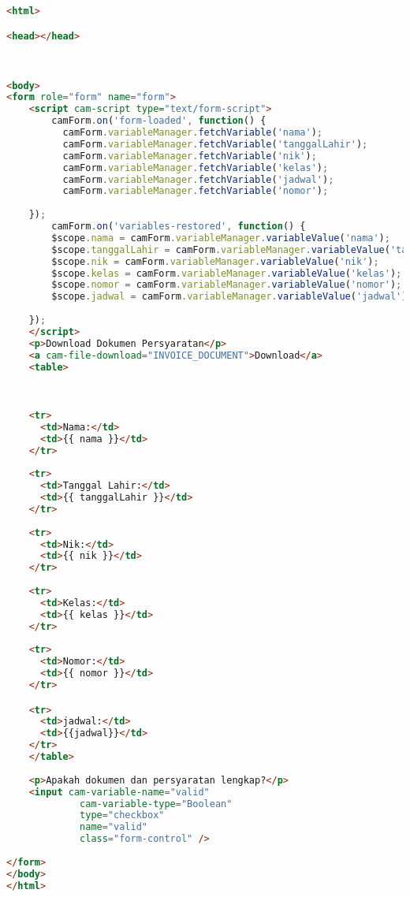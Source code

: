 \begin{lstlisting}[language=html,basicstyle=\tiny,caption=verifikasi-pendaftaran.html]
<html>

<head></head>


	
<body>
<form role="form" name="form">
	<script cam-script type="text/form-script">
    	camForm.on('form-loaded', function() {
	      camForm.variableManager.fetchVariable('nama');
	      camForm.variableManager.fetchVariable('tanggalLahir');
	      camForm.variableManager.fetchVariable('nik');
	      camForm.variableManager.fetchVariable('kelas');
	      camForm.variableManager.fetchVariable('jadwal');
	      camForm.variableManager.fetchVariable('nomor');
	      
    });
    	camForm.on('variables-restored', function() {
		$scope.nama = camForm.variableManager.variableValue('nama');
	    $scope.tanggalLahir = camForm.variableManager.variableValue('tanggalLahir');
	    $scope.nik = camForm.variableManager.variableValue('nik');
	    $scope.kelas = camForm.variableManager.variableValue('kelas');
	    $scope.nomor = camForm.variableManager.variableValue('nomor');
	    $scope.jadwal = camForm.variableManager.variableValue('jadwal');
	      
    });
  	</script>
  	<p>Download Dokumen Persyaratan</p>
  	<a cam-file-download="INVOICE_DOCUMENT">Download</a>
  	<table>
  	
  	

    <tr>
      <td>Nama:</td>
      <td>{{ nama }}</td>
    </tr>
    
    <tr>
      <td>Tanggal Lahir:</td>
      <td>{{ tanggalLahir }}</td>
    </tr>
    
    <tr>
      <td>Nik:</td>
      <td>{{ nik }}</td>
    </tr>
    
    <tr>
      <td>Kelas:</td>
      <td>{{ kelas }}</td>
    </tr>
    
    <tr>
      <td>Nomor:</td>
      <td>{{ nomor }}</td>
    </tr>

    <tr>
      <td>jadwal:</td>
      <td>{{jadwal}}</td>
    </tr>
    </table>
    
    <p>Apakah dokumen dan persyaratan lengkap?</p>
    <input cam-variable-name="valid"
             cam-variable-type="Boolean"
             type="checkbox"
             name="valid"
             class="form-control" />
    
</form> 
</body>
</html>
\end{lstlisting}

